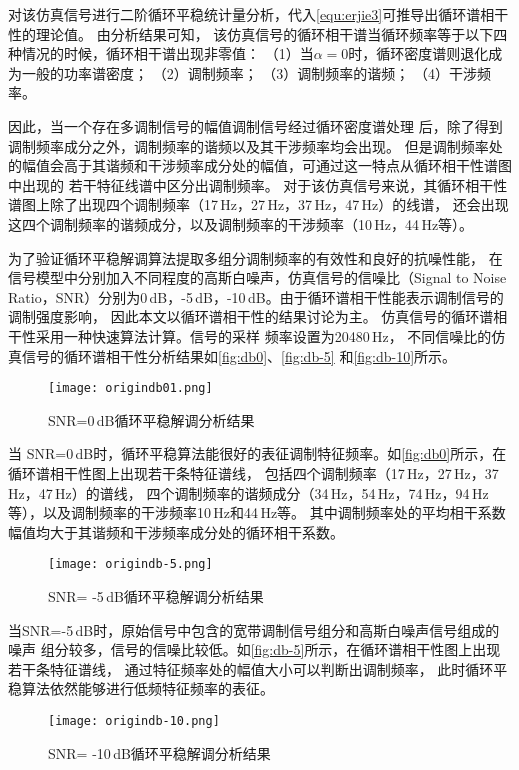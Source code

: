 对该仿真信号进行二阶循环平稳统计量分析，代入\autoref{equ:erjie3}可推导出循环谱相干性的理论值。
由分析结果可知，
该仿真信号的循环相干谱当循环频率等于以下四种情况的时候，循环相干谱出现非零值：
（1）当$\alpha=0$时，循环密度谱则退化成为一般的功率谱密度；
（2）调制频率；
（3）调制频率的谐频；
（4）干涉频率。

因此，当一个存在多调制信号的幅值调制信号经过循环密度谱处理
后，除了得到调制频率成分之外，调制频率的谐频以及其干涉频率均会出现。
但是调制频率处的幅值会高于其谐频和干涉频率成分处的幅值，可通过这一特点从循环相干性谱图中出现的
若干特征线谱中区分出调制频率。
对于该仿真信号来说，其循环相干性谱图上除了出现四个调制频率（17\,Hz，27\,Hz，37\,Hz，47\,Hz）的线谱，
还会出现这四个调制频率的谐频成分，以及调制频率的干涉频率（10\,Hz，44\,Hz等）。

为了验证循环平稳解调算法提取多组分调制频率的有效性和良好的抗噪性能，
在信号模型中分别加入不同程度的高斯白噪声，仿真信号的信噪比（Signal to Noise 
Ratio，SNR）分别为0\,dB，-5\,dB，-10\,dB。由于循环谱相干性能表示调制信号的调制强度影响，
因此本文以循环谱相干性的结果讨论为主。
仿真信号的循环谱相干性采用一种快速算法计算\cite{antoniFastComputationSpectral2017}。信号的采样
频率设置为20480\,Hz，
不同信噪比的仿真信号的循环谱相干性分析结果如\autoref{fig:db0}、\autoref{fig:db-5}
和\autoref{fig:db-10}所示。
\begin{figure}[htbp]
    \centering
    \texttt{[image: origindb01.png]}
    \caption{\label{fig:db0}SNR=0\,dB循环平稳解调分析结果}
\end{figure}

当 SNR=0\,dB时，循环平稳算法能很好的表征调制特征频率。如\autoref{fig:db0}所示，在循环谱相干性图上出现若干条特征谱线，
包括四个调制频率（17\,Hz，27\,Hz，37\,Hz，47\,Hz）的谱线，
四个调制频率的谐频成分（34\,Hz，54\,Hz，74\,Hz，94\,Hz等），以及调制频率的干涉频率10\,Hz和44\,Hz等。
其中调制频率处的平均相干系数幅值均大于其谐频和干涉频率成分处的循环相干系数。
\begin{figure}[htbp]
    \centering
    \texttt{[image: origindb-5.png]}
    \caption{\label{fig:db-5}SNR= -5\,dB循环平稳解调分析结果}
\end{figure}

当SNR=-5\,dB时，原始信号中包含的宽带调制信号组分和高斯白噪声信号组成的噪声
组分较多，信号的信噪比较低。如\autoref{fig:db-5}所示，在循环谱相干性图上出现若干条特征谱线，
通过特征频率处的幅值大小可以判断出调制频率，
此时循环平稳算法依然能够进行低频特征频率的表征。

\begin{figure}[htbp]
    \centering
    \texttt{[image: origindb-10.png]}
    \caption{\label{fig:db-10}SNR= -10\,dB循环平稳解调分析结果}
\end{figure}

